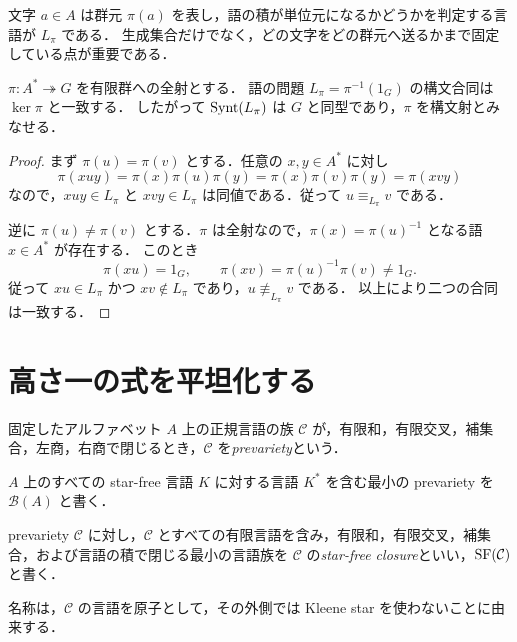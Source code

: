 文字 $a\in A$ は群元 $\pi(a)$ を表し，語の積が単位元になるかどうかを判定する言語が $L_\pi$ である．
生成集合だけでなく，どの文字をどの群元へ送るかまで固定している点が重要である．

\begin{proposition}[群の語の問題の構文モノイド]\label{prop:group-syntactic}
$\pi:A^*\twoheadrightarrow G$ を有限群への全射とする．
語の問題 $L_\pi=\pi^{-1}(1_G)$ の構文合同は $\ker\pi$ と一致する．
したがって $\operatorname{Synt}(L_\pi)$ は $G$ と同型であり，$\pi$ を構文射とみなせる．
\end{proposition}

\begin{proof}
まず $\pi(u)=\pi(v)$ とする．任意の $x,y\in A^*$ に対し
\[
\pi(xuy)=\pi(x)\pi(u)\pi(y)=\pi(x)\pi(v)\pi(y)=\pi(xvy)
\]
なので，$xuy\in L_\pi$ と $xvy\in L_\pi$ は同値である．従って $u\equiv_{L_\pi}v$ である．

逆に $\pi(u)\neq\pi(v)$ とする．$\pi$ は全射なので，$\pi(x)=\pi(u)^{-1}$ となる語 $x\in A^*$ が存在する．
このとき
\[
\pi(xu)=1_G,
\qquad
\pi(xv)=\pi(u)^{-1}\pi(v)\neq1_G.
\]
従って $xu\in L_\pi$ かつ $xv\notin L_\pi$ であり，$u\not\equiv_{L_\pi}v$ である．
以上により二つの合同は一致する．
\end{proof}

\section{高さ一の式を平坦化する}

\begin{definition}[prevariety]
固定したアルファベット $A$ 上の正規言語の族 $\mathcal C$ が，有限和，有限交叉，補集合，左商，右商で閉じるとき，$\mathcal C$ を\emph{prevariety}という．
\end{definition}

\begin{definition}[$\mathcal B(A)$]
$A$ 上のすべての star-free 言語 $K$ に対する言語 $K^*$ を含む最小の prevariety を $\mathcal B(A)$ と書く．
\end{definition}

\begin{definition}
prevariety $\mathcal C$ に対し，$\mathcal C$ とすべての有限言語を含み，有限和，有限交叉，補集合，および言語の積で閉じる最小の言語族を $\mathcal C$ の\emph{star-free closure}といい，$\operatorname{SF}(\mathcal C)$ と書く．
\end{definition}

名称は，$\mathcal C$ の言語を原子として，その外側では Kleene star を使わないことに由来する．

